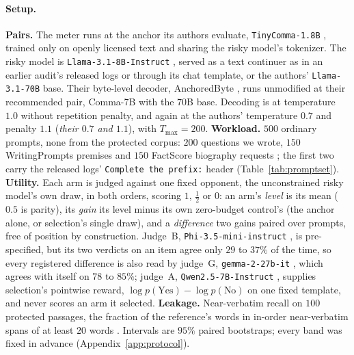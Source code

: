 \paragraph{Setup.}\label{sec:setup} \textbf{Pairs.} The meter runs at the anchor its authors evaluate, \texttt{TinyComma-1.8B}
\citep{he2026anchored,kandpal2025commonpile}, trained only on openly licensed text and sharing the risky
model's tokenizer. The risky model is \texttt{Llama-3.1-8B-Instruct}
\citep{grattafiori2024llama3}, served as a text continuer as in an earlier audit's released logs
\citep{vijayavallabh2026audit} or through its chat template, or the authors' \texttt{Llama-3.1-70B} base. Their byte-level decoder, AnchoredByte \citep{hayase2026bytesampler}, runs unmodified at their
recommended pair, Comma-7B with the $70$B base. Decoding is at temperature $1.0$ without repetition penalty, and again at the authors' temperature $0.7$ and penalty $1.1$ (\emph{their $0.7$ and $1.1$}), with $T_{\max}=200$. \textbf{Workload.} $500$ ordinary
prompts, none from the protected corpus: $200$ questions we wrote, $150$ WritingPrompts premises
\citep{fan2018writingprompts} and $150$ FactScore biography requests \citep{min2023factscore}; the first
two carry the released logs' \texttt{Complete the prefix:} header (Table~\ref{tab:promptset}).
\textbf{Utility.} Each arm is judged against one fixed opponent, the unconstrained risky model's own draw,
in both orders, scoring $1$, $\tfrac12$ or $0$: an arm's \emph{level} is its mean ($0.5$ is parity), its
\emph{gain} its level minus its own zero-budget control's (the anchor alone, or selection's single draw),
and a \emph{difference} two gains paired over prompts, free of position by construction. Judge~B, \texttt{Phi-3.5-mini-instruct}
\citep{abdin2024phi3}, is pre-specified, but its two verdicts on an item agree only $29$ to $37\%$ of the
time, so every registered difference is also read by judge~G, \texttt{gemma-2-27b-it}
\citep{gemma2024gemma2}, which agrees with itself on $78$ to $85\%$; judge~A,
\texttt{Qwen2.5-7B-Instruct} \citep{qwen2025qwen25}, supplies selection's pointwise reward,
$\log p(\text{Yes}) - \log p(\text{No})$ on one fixed template, and never scores an arm it selected.
\textbf{Leakage.} Near-verbatim recall on $100$ protected passages, the fraction of the reference's words in
in-order near-verbatim spans of at least $20$ words \citep{ahmed2026extracting}.
Intervals are $95\%$ paired bootstraps; every band was fixed in advance (Appendix~\ref{app:protocol}).

